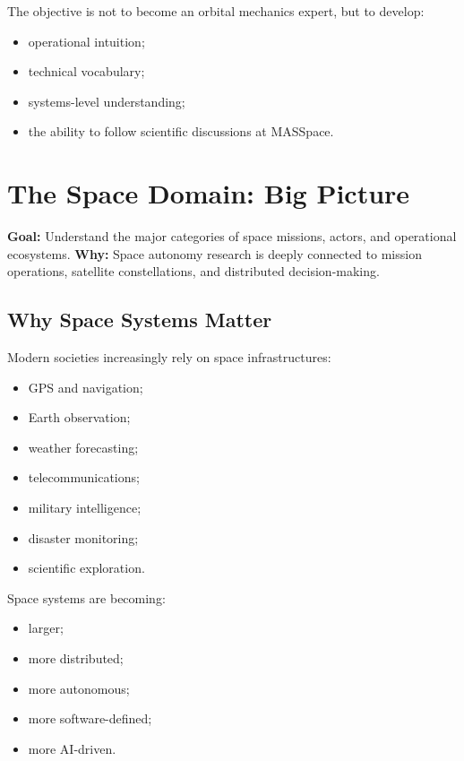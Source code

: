 \documentclass[10pt,a4paper,twocolumn]{article}
\newcommand{\lesson}[3]{
\section{#1}
\noindent
\textbf{Goal:} #2 \newline
\textbf{Why:} #3
\vspace{0.1em}
}
\begin{document}
The objective is not to become an orbital mechanics expert, but to develop:
\begin{itemize}
    \item operational intuition;
    \item technical vocabulary;
    \item systems-level understanding;
    \item the ability to follow scientific discussions at MASSpace.
\end{itemize}



\lesson
{The Space Domain: Big Picture}
{Understand the major categories of space missions, actors, and operational ecosystems.}
{Space autonomy research is deeply connected to mission operations, satellite constellations, and distributed decision-making.}


\subsection{Why Space Systems Matter}

Modern societies increasingly rely on space infrastructures:
\begin{itemize}
    \item GPS and navigation;
    \item Earth observation;
    \item weather forecasting;
    \item telecommunications;
    \item military intelligence;
    \item disaster monitoring;
    \item scientific exploration.
\end{itemize}

Space systems are becoming:
\begin{itemize}
    \item larger;
    \item more distributed;
    \item more autonomous;
    \item more software-defined;
    \item more AI-driven.
\end{itemize}
\end{document}
